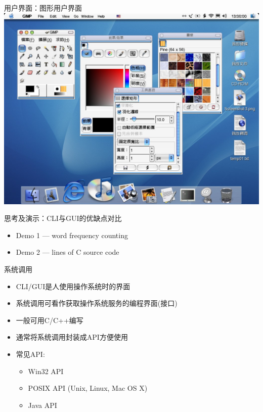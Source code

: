 \documentclass[xcolor=svgnames]{beamer}
\begin{document}
\begin{CJK*}{UTF8}{gbsn}
\begin{frame}{用户界面：图形用户界面}
\includegraphics[width=1.0\textwidth]{macos.jpg}
\end{frame}

\begin{frame}{思考及演示：CLI与GUI的优缺点对比}
\begin{itemize}
\item Demo 1 --- word frequency counting
\item Demo 2 --- lines of C source code 
\end{itemize}
\end{frame}

\begin{frame}{系统调用}
\begin{itemize}
\item CLI/GUI是人使用操作系统时的界面
\item 系统调用可看作获取操作系统服务的编程界面(接口)
\item 一般可用C/C++编写
\item 通常将系统调用封装成API方便使用
\item 常见API:
\begin{itemize}
\item Win32 API
\item POSIX API (Unix, Linux, Mac OS X)
\item Java API
\end{itemize}
\end{itemize}
\end{frame}


\end{CJK*}
\end{document}
